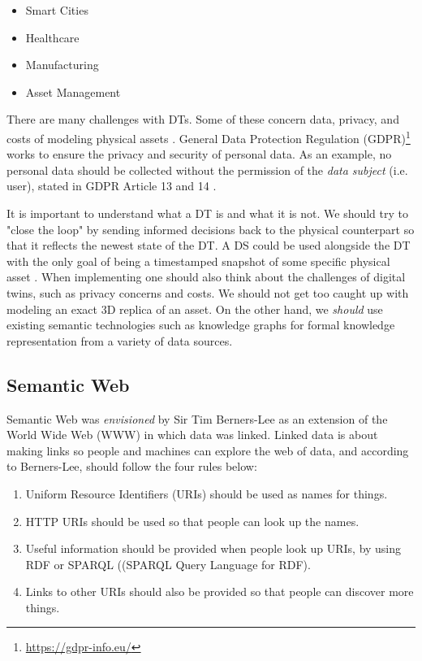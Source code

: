 \documentclass{article}
\begin{document}
\begin{itemize}
    \item Smart Cities
    \item Healthcare
    \item Manufacturing
    \item Asset Management
\end{itemize}


There are many challenges with DTs. Some of these concern data, privacy, and costs of modeling physical assets \cite{fuller_digital_2020, waszak_let_2022}. General Data Protection Regulation (GDPR)\footnote{\url{https://gdpr-info.eu/}} works to ensure the privacy and security of personal data. As an example, no personal data should be collected without the permission of the \emph{data subject} (i.e. user), stated in GDPR Article 13 and 14 \cite{noauthor_guide_nodate}.


It is important to understand what a DT is and what it is not. We should try to "close the loop" by sending informed decisions back to the physical counterpart so that it reflects the newest state of the DT. A DS could be used alongside the DT with the only goal of being a timestamped snapshot of some specific physical asset \cite{bergs_concept_2021}. When implementing one should also think about the challenges of digital twins, such as privacy concerns and costs. We should not get too caught up with modeling an exact 3D replica of an asset. On the other hand, we \emph{should} use existing semantic technologies such as knowledge graphs for formal knowledge representation from a variety of data sources.


\subsection{Semantic Web}
Semantic Web was \emph{envisioned} by Sir Tim Berners-Lee as an extension of the World Wide Web (WWW) in which data was linked. Linked data is about making links so people and machines can explore the web of data, and according to Berners-Lee, should follow the four rules \cite{tim_berners-lee_linked_nodate} below: 

\begin{enumerate}
    \item Uniform Resource Identifiers (URIs) should be used as names for things.
    \item HTTP URIs should be used so that people can look up the names.
    \item Useful information should be provided when people look up URIs, by using RDF or SPARQL ((SPARQL Query Language for RDF).
    \item Links to other URIs should also be provided so that people can discover more things.
\end{enumerate}
\end{document}
